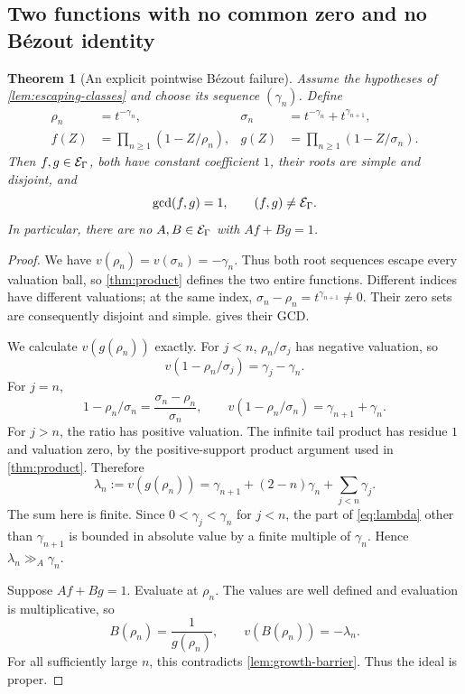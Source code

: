 \documentclass[11pt]{article}
\newtheorem{theorem}{Theorem}[section]
\theoremstyle{plain}
\theoremstyle{plain}
\theoremstyle{plain}
\theoremstyle{definition}
\theoremstyle{definition}
\theoremstyle{definition}
\theoremstyle{remark}
\newcommand{\ggA}{\mathrel{\gg_{\!A}}}
\begin{document}
\subsection{Two functions with no common zero and no B\'ezout identity}
\begin{theorem}[An explicit pointwise B\'ezout failure]\label{thm:no-bezout}
Assume the hypotheses of \cref{lem:escaping-classes} and choose its
sequence $(\gamma_n)$. Define
\begin{align}
 \rho_n&=t^{-\gamma_n},&
 \sigma_n&=t^{-\gamma_n}+t^{\gamma_{n+1}},\label{eq:paired-roots}\\
 f(Z)&=\prod_{n\ge1}(1-Z/\rho_n),&
 g(Z)&=\prod_{n\ge1}(1-Z/\sigma_n).\label{eq:paired-products}
\end{align}
Then $f,g\in\mathcal E_\Gamma$, both have constant coefficient $1$, their roots
are simple and disjoint, and
\[
 \gcd(f,g)=1,\qquad (f,g)\ne\mathcal E_\Gamma.
\]
In particular, there are no $A,B\in\mathcal E_\Gamma$ with $Af+Bg=1$.
\end{theorem}
\begin{proof}
We have $v(\rho_n)=v(\sigma_n)=-\gamma_n$. Thus both root sequences
escape every valuation ball, so \cref{thm:product} defines the two
entire functions. Different indices have different valuations; at the
same index, $\sigma_n-\rho_n=t^{\gamma_{n+1}}\ne0$. Their zero sets
are consequently disjoint and simple.  gives their GCD.

We calculate $v(g(\rho_n))$ exactly. For $j<n$, $\rho_n/\sigma_j$
has negative valuation, so
\[
 v(1-\rho_n/\sigma_j)=\gamma_j-\gamma_n.
\]
For $j=n$,
\[
 1-\rho_n/\sigma_n
   =\frac{\sigma_n-\rho_n}{\sigma_n},\qquad
 v(1-\rho_n/\sigma_n)=\gamma_{n+1}+\gamma_n.
\]
For $j>n$, the ratio has positive valuation. The infinite tail product
has residue $1$ and valuation zero, by the positive-support product
argument used in \cref{thm:product}. Therefore
\begin{equation}\label{eq:lambda}
 \lambda_n:=v(g(\rho_n))
   =\gamma_{n+1}+(2-n)\gamma_n+\sum_{j<n}\gamma_j.
\end{equation}
The sum here is finite. Since $0<\gamma_j<\gamma_n$ for $j<n$, the
part of \eqref{eq:lambda} other than $\gamma_{n+1}$ is bounded in
absolute value by a finite multiple of $\gamma_n$. Hence
$\lambda_n\ggA\gamma_n$.

Suppose $Af+Bg=1$. Evaluate at $\rho_n$. The values are well defined
and evaluation is multiplicative, so
\[
 B(\rho_n)=\frac1{g(\rho_n)},\qquad
 v(B(\rho_n))=-\lambda_n.
\]
For all sufficiently large $n$, this contradicts
\cref{lem:growth-barrier}. Thus the ideal is proper.
\end{proof}
\end{document}
